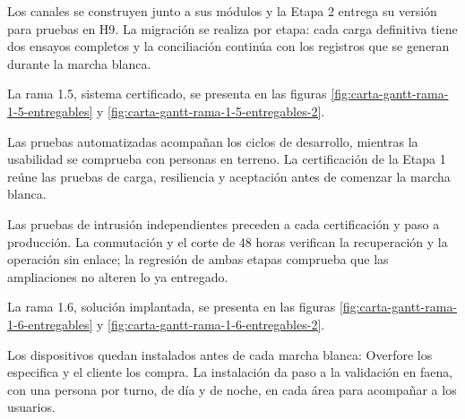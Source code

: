 \documentclass[formulario]{../../comun/overfore}
\begin{document}
\begin{horizontal}
Los canales se construyen junto a sus módulos y la Etapa 2 entrega su versión para pruebas en H9. La migración se realiza por etapa: cada carga definitiva tiene dos ensayos completos y la conciliación continúa con los registros que se generan durante la marcha blanca.

La rama 1.5, sistema certificado, se presenta en las figuras \ref{fig:carta-gantt-rama-1-5-entregables} y \ref{fig:carta-gantt-rama-1-5-entregables-2}.

Las pruebas automatizadas acompañan los ciclos de desarrollo, mientras la usabilidad se comprueba con personas en terreno. La certificación de la Etapa 1 reúne las pruebas de carga, resiliencia y aceptación antes de comenzar la marcha blanca.

Las pruebas de intrusión independientes preceden a cada certificación y paso a producción. La conmutación y el corte de 48 horas verifican la recuperación y la operación sin enlace; la regresión de ambas etapas comprueba que las ampliaciones no alteren lo ya entregado.

La rama 1.6, solución implantada, se presenta en las figuras \ref{fig:carta-gantt-rama-1-6-entregables} y \ref{fig:carta-gantt-rama-1-6-entregables-2}.

Los dispositivos quedan instalados antes de cada marcha blanca: Overfore los especifica y el cliente los compra. La instalación da paso a la validación en faena, con una persona por turno, de día y de noche, en cada área para acompañar a los usuarios.


\end{horizontal}
\end{document}
